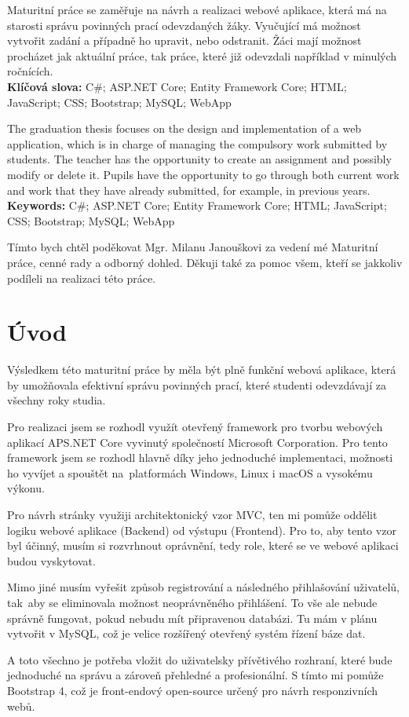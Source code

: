 \documentclass[a4paper, 12pt]{report}
\begin{document}
	\titulniStrana
	
	\anotace Maturitní práce se zaměřuje na návrh a realizaci webové aplikace, která má na starosti správu povinných prací odevzdaných žáky. Vyučující má možnost vytvořit zadání a případně ho upravit, nebo odstranit. Žáci mají možnost procházet jak aktuální práce, tak práce, které již odevzdali například v minulých ročnících. \\
	\textbf{Klíčová slova: } C\#; ASP.NET Core; Entity Framework Core; HTML; JavaScript; CSS; Bootstrap; MySQL; WebApp

	\annotation The graduation thesis focuses on the design and implementation of a web application, which is in charge of managing the compulsory work submitted by students. The teacher has the opportunity to create an assignment and possibly modify or delete it. Pupils have the opportunity to go through both current work and work that they have already submitted, for example, in previous years.\\
	\textbf{Keywords: } C\#; ASP.NET Core; Entity Framework Core; HTML; JavaScript; CSS; Bootstrap; MySQL; WebApp


	\podekovani Tímto bych chtěl poděkovat Mgr. Milanu Janouškovi za vedení mé Maturitní práce, cenné rady a odborný dohled. Děkuji také za pomoc všem, kteří se jakkoliv podíleli na realizaci této práce.
	
	\obsah

	\chapter{Úvod}
    Výsledkem této maturitní práce by měla být plně funkční webová aplikace, která by umožňovala efektivní správu povinných prací, které studenti odevzdávají za všechny roky studia.\par
	Pro realizaci jsem se rozhodl využít otevřený framework pro tvorbu webových aplikací APS.NET Core vyvinutý společností Microsoft Corporation. Pro tento framework jsem se rozhodl hlavně díky jeho jednoduché implementaci, možnosti ho vyvíjet a spouštět na~platformách Windows, Linux i macOS a vysokému výkonu.\par
	Pro návrh stránky využiji architektonický vzor MVC, ten mi pomůže oddělit logiku webové aplikace (Backend) od výstupu (Frontend). Pro to, aby tento vzor byl účinný, musím si rozvrhnout oprávnění, tedy role, které se ve webové aplikaci budou vyskytovat.\par
	Mimo jiné musím vyřešit způsob registrování a následného přihlašování uživatelů, tak~aby se eliminovala možnost neoprávněného přihlášení. To vše ale nebude správně fungovat, pokud nebudu mít připravenou databázi. Tu mám v plánu vytvořit v MySQL, což je velice rozšířený otevřený systém řízení báze dat.\par
	A toto všechno je potřeba vložit do uživatelsky přívětivého rozhraní, které bude jednoduché na správu a zároveň přehledné a profesionální. S tímto mi pomůže Bootstrap 4, což je front-endový open-source určený pro návrh responzivních webů.
\end{document}
